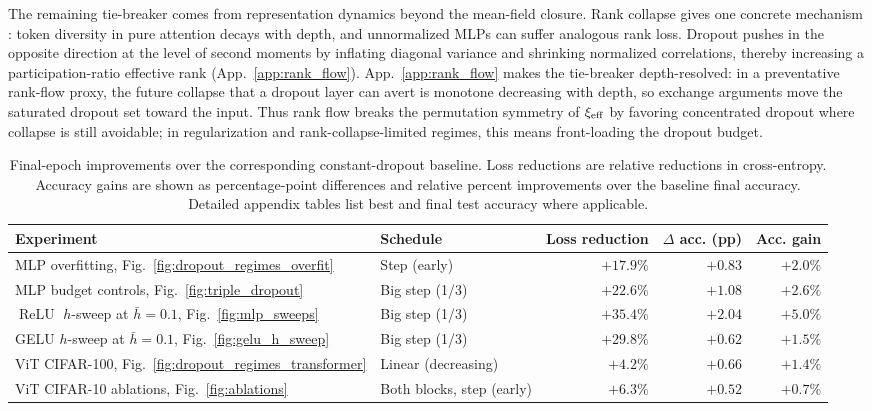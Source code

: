 \documentclass{article}
\DeclareMathOperator{\ReLU}{ReLU}
\newcommand{\relu}{\ensuremath{\ReLU}}
\theoremstyle{plain}
\theoremstyle{definition}
\theoremstyle{remark}
\begin{document}
The remaining tie-breaker comes from representation dynamics beyond the mean-field closure. Rank collapse gives one concrete mechanism \cite{dong2021attention,noci2022signalpropagation,daneshmand2020batch}: token diversity in pure attention decays with depth, and unnormalized MLPs can suffer analogous rank loss. Dropout pushes in the opposite direction at the level of second moments by inflating diagonal variance and shrinking normalized correlations, thereby increasing a participation-ratio effective rank (App.~\ref{app:rank_flow}). App.~\ref{app:rank_flow} makes the tie-breaker depth-resolved: in a preventative rank-flow proxy, the future collapse that a dropout layer can avert is monotone decreasing with depth, so exchange arguments move the saturated dropout set toward the input. Thus rank flow breaks the permutation symmetry of \(\xi_{\rm eff}\) by favoring concentrated dropout where collapse is still avoidable; in regularization and rank-collapse-limited regimes, this means front-loading the dropout budget.

\begin{table}[t]
\caption{Final-epoch improvements over the corresponding constant-dropout baseline. Loss reductions are relative reductions in cross-entropy. Accuracy gains are shown as percentage-point differences and relative percent improvements over the baseline final accuracy. Detailed appendix tables list best and final test accuracy where applicable.}
\label{tab:loss_improvements}
\centering
\scriptsize
\setlength{\tabcolsep}{4pt}
\begin{tabular}{@{}L{0.27\textwidth}L{0.23\textwidth}rrr@{}}
\toprule
\textbf{Experiment} & \textbf{Schedule} & Loss reduction & \(\Delta\) acc. (pp) & Acc. gain \\
\midrule
MLP overfitting, Fig.~\ref{fig:dropout_regimes_overfit}
& Step (early)
& \(+17.9\%\) & \(+0.83\) & \(+2.0\%\) \\
\addlinespace[1pt]
MLP budget controls, Fig.~\ref{fig:triple_dropout}
& Big step (1/3)
& \(+22.6\%\) & \(+1.08\) & \(+2.6\%\) \\
\addlinespace[1pt]
\relu{} \(h\)-sweep at \(\bar h=0.1\), Fig.~\ref{fig:mlp_sweeps}
& Big step (1/3)
& \(+35.4\%\) & \(+2.04\) & \(+5.0\%\) \\
\addlinespace[1pt]
GELU \(h\)-sweep at \(\bar h=0.1\), Fig.~\ref{fig:gelu_h_sweep}
& Big step (1/3)
& \(+29.8\%\) & \(+0.62\) & \(+1.5\%\) \\
\addlinespace[1pt]
ViT CIFAR-100, Fig.~\ref{fig:dropout_regimes_transformer}
& Linear (decreasing)
& \(+4.2\%\) & \(+0.66\) & \(+1.4\%\) \\
\addlinespace[1pt]
ViT CIFAR-10 ablations, Fig.~\ref{fig:ablations}
& Both blocks, step (early)
& \(+6.3\%\) & \(+0.52\) & \(+0.7\%\) \\
\bottomrule
\end{tabular}
\end{table}
\end{document}
